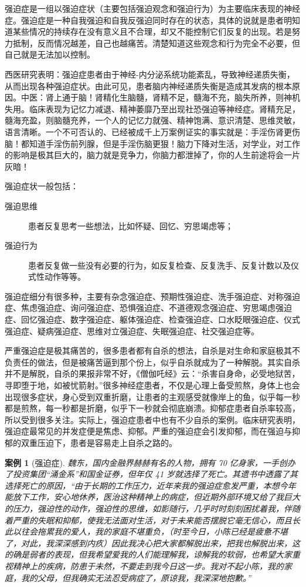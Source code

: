 \documentclass{ctexart}
\newtheorem{case}{案例}
\begin{document}
强迫症是一组以强迫症状（主要包括强迫观念和强迫行为）为主要临床表现的神经症。强迫症是一种自我强迫和自我反强迫同时存在的状态，具体的说就是患者明知道某些情况的持续存在没有意义且不合理，却又不能控制它们反复的出现。若是努力抵制，反而情况越差，自己也越痛苦。清楚知道这些观念和行为完全不必要，但自己就是无法加以控制。

西医研究表明：强迫症患者由于神经-内分泌系统功能紊乱，导致神经递质失衡，从而出现各种强迫症状。由此可见，患者脑内神经递质失衡是造成其发病的根本原因。中医：肾上通于脑！肾精化生脑髓，肾精不足，髓海不充，脑失所养，则神机失用。临床表现为记忆力减退、精神萎靡乃至出现社恐强迫等神经症。肾精充足，髓海充盈，则脑髓充养，一个人的记忆力就强、精神饱满、意识清楚、思维灵敏，语言清晰。一个不可否认的、已经被成千上万案例证实的事实就是：手淫伤肾更伤脑！都知道手淫伤前列腺，但是手淫伤脑更狠！脑力下降对生活，对学业，对工作的影响是极其巨大的，脑力就是竞争力，你脑力都泄掉了，你的人生前途将会一片灰暗！

强迫症状一般包括：

\begin{description}
    \item[强迫思维] 患者反复思考一些想法，比如怀疑、回忆、穷思竭虑等；
    \item[强迫行为] 患者反复做一些没有必要的行为，如反复检查、反复洗手、反复计数以及仪式性动作等等。
\end{description}

强迫症细分有很多种，主要有杂念强迫症、预期性强迫症、洗手强迫症、对称强迫症、焦虑强迫症、询问强迫症、恐惧强迫症、不道德观念强迫症、穷思竭虑强迫症、回忆强迫症、数字强迫症、躯体强迫症、检查强迫症、口水眨眼强迫症、仪式强迫症、疑病强迫症、思维对立强迫症、失眠强迫症、社交强迫症等。

严重强迫症是极其痛苦的，很多患者都有自杀的想法，自杀是对生命和家庭极其不负责任的做法，但是被痛苦逼到那个份上，似乎自杀就成为了一种解脱。其实自杀并不是解脱，自杀的果报非常不好，《僧伽吒经》云：“杀害自身命，必受地狱苦，寻即堕于地，如被忧箭射。”很多神经症患者，不仅是心理上备受煎熬，身体上也会出现很多症状，身心受到双重折磨，让患者的主观感受就像岸上的鱼，似乎每一秒都是煎熬，每一秒都是折磨，似乎下一秒就会彻底崩溃。抑郁症患者自杀率较高，所以受到很多关注。实际上，强迫症患者中也有不少自杀的案例。临床研究表明，强迫症最常见的并发症便是焦虑、抑郁。严重的强迫症会引发抑郁，而在强迫与抑郁的双重压迫下，患者是容易走上自杀之路的。

\begin{case}[强迫症]
    魏东，国内金融界赫赫有名的人物，拥有 70 亿身家，一手创办了投资集团“涌金系”和国金证券，但年仅 41 岁就选择了死亡。其遗书中透露了其选择死亡的原因，“由于长期的工作压力，近年来我的强迫症愈发严重，本想今年能放下工作，安心地休养，医治这种精神上的病症，但近期外部环境又给了我巨大的压力，强迫性的动作，强迫性的思维，如影随行，几乎时时刻刻困扰着我，伴随着严重的失眠和抑郁，使我无法面对生活，对于未来能否摆脱它毫无信心，而且长此以往会拖累我的爱人，我的家庭不堪重负，（时至今日，小陈已经是疲惫不堪了，对此，我深深感到内疚）因此我决心把大家都解脱出来，把我也解脱出来，这的确是弱者的表现，但我希望爱我的人们能理解我，谅解我的软弱，也希望大家重视精神上的疾病，防患于未然，不要走到我今日这一步。我对不起小陈，我的家庭，我的父母，但我确实无法忍受病症了，原谅我，我深深地抱歉。”
\end{case}
\end{document}
